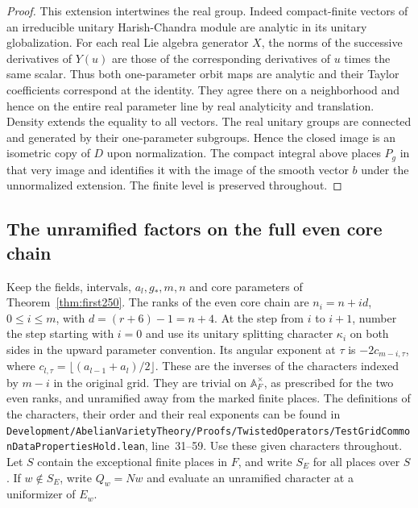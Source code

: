 \documentclass[a4paper,11pt]{article}
\theoremstyle{definition}
\theoremstyle{remark}
\newcommand{\srcloc}[2]{{\small\nolinkurl{#1.lean}}, line~#2}
\numberwithin{equation}{section}
\begin{document}
\begin{proof}
This extension intertwines the real group. Indeed compact-finite
vectors of an irreducible unitary Harish-Chandra module are analytic
in its unitary globalization. For each real Lie algebra generator
\(X\), the norms of the successive derivatives of \(Y(u)\) are those
of the corresponding derivatives of \(u\) times the same scalar.
Thus both one-parameter orbit maps are analytic and their Taylor
coefficients correspond at the identity. They agree there on a
neighborhood and hence on the entire real parameter line by real
analyticity and translation. Density extends the equality to all
vectors. The real unitary groups are connected and generated by their
one-parameter subgroups. Hence the closed image is an isometric copy
of \(D\) upon normalization. The compact integral above places \(P_g\)
in that very image and identifies it with the image of the smooth
vector \(b\) under the unnormalized extension. The finite level is
preserved throughout.
\end{proof}

\subsection{The unramified factors on the full even core chain}\label{nav:III-41}
Keep the fields, intervals, \(a_l,g_*,m,n\) and core parameters of
Theorem~\ref{thm:first250}. The ranks of the even core chain are
\(n_i=n+i d\), \(0\le i\le m\), with
\(d=(r+6)-1=n+4\). At the step from \(i\) to \(i+1\), number the
step starting with \(i=0\) and use its unitary splitting character
\(\kappa_i\) on both sides in the upward parameter convention. Its
angular exponent at \(\tau\) is \(-2c_{m-i,\tau}\), where
\(c_{l,\tau}=\lfloor(a_{l-1}+a_l)/2\rfloor\). These are the inverses
of the characters indexed by \(m-i\) in the original grid. They are
trivial on \(\mathbb A_F^\times\), as prescribed for the two even
ranks, and unramified away from the marked finite places. The definitions
of the characters, their order and their real exponents can be found in
\srcloc{Development/AbelianVarietyTheory/Proofs/TwistedOperators/TestGridCommonDataPropertiesHold}{31--59}.
Use these given characters throughout. Let \(S\) contain the exceptional
finite places in \(F\), and write \(S_E\) for all places over \(S\).
If \(w\notin S_E\), write \(Q_w=Nw\) and evaluate an unramified
character at a uniformizer of \(E_w\).
\end{document}

